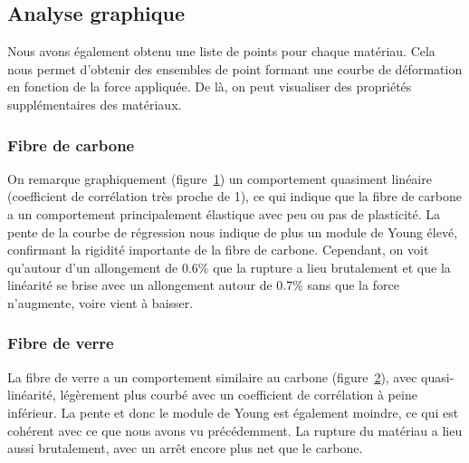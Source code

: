 \subsection{Analyse graphique}

Nous avons également obtenu une liste de points pour chaque matériau.
Cela nous permet d'obtenir des ensembles de point formant une courbe de déformation en fonction de la force appliquée.
De là, on peut visualiser des propriétés supplémentaires des matériaux.

\subsubsection{Fibre de carbone}
\begin{figure}[!htb]
    \centering
    
    \label{fig:plot_carbon}
\end{figure}
On remarque graphiquement (figure~\ref{fig:plot_carbon}) un comportement quasiment linéaire (coefficient de corrélation très proche de 1), ce qui indique que la fibre de carbone a un comportement principalement élastique avec peu ou pas de plasticité.
La pente de la courbe de régression nous indique de plus un module de Young élevé, confirmant la rigidité importante de la fibre de carbone.
Cependant, on voit qu'autour d'un allongement de 0.6\% que la rupture a lieu brutalement et que la linéarité se brise avec un allongement autour de 0.7\% sans que la force n'augmente, voire vient à baisser.

\subsubsection{Fibre de verre}
\begin{figure}[!htb]
    \centering
    
    \label{fig:plot_glass}
\end{figure}
La fibre de verre a un comportement similaire au carbone (figure~\ref{fig:plot_glass}), avec quasi-linéarité, légèrement plus courbé avec un coefficient de corrélation à peine inférieur.
La pente et donc le module de Young est également moindre, ce qui est cohérent avec ce que nous avons vu précédemment.
La rupture du matériau a lieu aussi brutalement, avec un arrêt encore plus net que le carbone.

